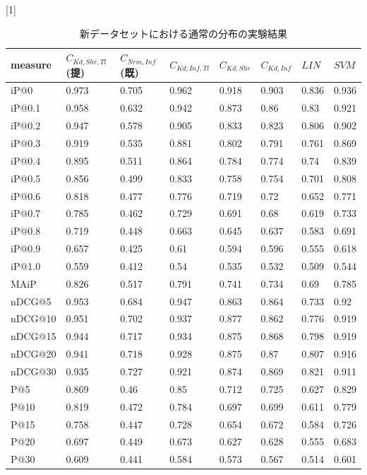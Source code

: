 \begin{table}[h]
  \caption{新データセットにおける通常の分布の実験結果} 
  \label{tbl:resultNormal}
  \begin{center} {
\scalebox{0.9}[1]{
    \begin{tabular}{|l|l|l|lllll|}\hline
measure&$C_{Kd,Shr,Tl}$(提)&$C_{Nrm,Inf}$(既)&$C_{Kd,Inf,Tl}$&$C_{Kd,Shr}$&$C_{Kd,Inf}$&$LIN$&$SVM$\\ \hline
iP@0&0.973&0.705&0.962&0.918&0.903&0.836&0.936\\
iP@0.1&0.958&0.632&0.942&0.873&0.86&0.83&0.921\\
iP@0.2&0.947&0.578&0.905&0.833&0.823&0.806&0.902\\
iP@0.3&0.919&0.535&0.881&0.802&0.791&0.761&0.869\\
iP@0.4&0.895&0.511&0.864&0.784&0.774&0.74&0.839\\
iP@0.5&0.856&0.499&0.833&0.758&0.754&0.701&0.808\\
iP@0.6&0.818&0.477&0.776&0.719&0.72&0.652&0.771\\
iP@0.7&0.785&0.462&0.729&0.691&0.68&0.619&0.733\\
iP@0.8&0.719&0.448&0.663&0.645&0.637&0.583&0.691\\
iP@0.9&0.657&0.425&0.61&0.594&0.596&0.555&0.618\\
iP@1.0&0.559&0.412&0.54&0.535&0.532&0.509&0.544\\ \hline
MAiP&0.826&0.517&0.791&0.741&0.734&0.69&0.785\\ \hline
nDCG@5&0.953&0.684&0.947&0.863&0.864&0.733&0.92\\
nDCG@10&0.951&0.702&0.937&0.877&0.862&0.776&0.919\\
nDCG@15&0.944&0.717&0.934&0.875&0.868&0.798&0.919\\
nDCG@20&0.941&0.718&0.928&0.875&0.87&0.807&0.916\\
nDCG@30&0.935&0.727&0.921&0.874&0.869&0.821&0.911\\ \hline
P@5&0.869&0.46&0.85&0.712&0.725&0.627&0.829\\
P@10&0.819&0.472&0.784&0.697&0.699&0.611&0.779\\
P@15&0.758&0.447&0.728&0.654&0.672&0.584&0.726\\
P@20&0.697&0.449&0.673&0.627&0.628&0.555&0.683\\
P@30&0.609&0.441&0.584&0.573&0.567&0.514&0.601\\ \hline
\end{tabular}
  }
    }
  \end{center}
\end{table}

